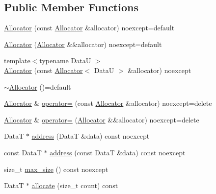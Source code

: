 \subsection*{Public Member Functions}
\begin{DoxyCompactItemize}
\item 
\hyperlink{structmage_1_1_memory_arena_1_1_allocator_ac7d640d69207604612c29ebc60ec6648}{Allocator} (const \hyperlink{structmage_1_1_memory_arena_1_1_allocator}{Allocator} \&allocator) noexcept=default
\item 
\hyperlink{structmage_1_1_memory_arena_1_1_allocator_a54ddc035b0987d71776c54a1240be18d}{Allocator} (\hyperlink{structmage_1_1_memory_arena_1_1_allocator}{Allocator} \&\&allocator) noexcept=default
\item 
{\footnotesize template$<$typename DataU $>$ }\\\hyperlink{structmage_1_1_memory_arena_1_1_allocator_a9485ec7437c3c798a37c67631aa7e8ab}{Allocator} (const \hyperlink{structmage_1_1_memory_arena_1_1_allocator}{Allocator}$<$ DataU $>$ \&allocator) noexcept
\item 
\hyperlink{structmage_1_1_memory_arena_1_1_allocator_a3324ead39d8cdfb8a119425879101e0a}{$\sim$\+Allocator} ()=default
\item 
\hyperlink{structmage_1_1_memory_arena_1_1_allocator}{Allocator} \& \hyperlink{structmage_1_1_memory_arena_1_1_allocator_ad9427ed4b443205b09d6db49b53d8441}{operator=} (const \hyperlink{structmage_1_1_memory_arena_1_1_allocator}{Allocator} \&allocator) noexcept=delete
\item 
\hyperlink{structmage_1_1_memory_arena_1_1_allocator}{Allocator} \& \hyperlink{structmage_1_1_memory_arena_1_1_allocator_af0e3639550c1b201abfac8f0e1a96acb}{operator=} (\hyperlink{structmage_1_1_memory_arena_1_1_allocator}{Allocator} \&\&allocator) noexcept=delete
\item 
DataT $\ast$ \hyperlink{structmage_1_1_memory_arena_1_1_allocator_a0c93aee3ba1247b1ad34b304f00418fd}{address} (DataT \&data) const noexcept
\item 
const DataT $\ast$ \hyperlink{structmage_1_1_memory_arena_1_1_allocator_a823bf66f6693fc85b2ccb146e1c0ba58}{address} (const DataT \&data) const noexcept
\item 
size\+\_\+t \hyperlink{structmage_1_1_memory_arena_1_1_allocator_a6a68403f6f6a3c381b1ddff02cb8a733}{max\+\_\+size} () const noexcept
\item 
DataT $\ast$ \hyperlink{structmage_1_1_memory_arena_1_1_allocator_a46d428590d87f47742abc173858ccc95}{allocate} (size\+\_\+t count) const

\end{DoxyCompactItemize}
